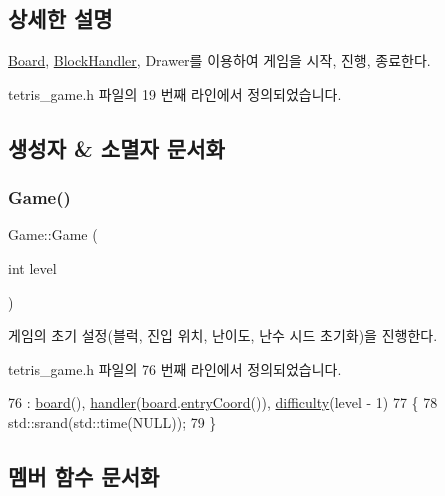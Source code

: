 \subsection{상세한 설명}
\mbox{\hyperlink{class_board}{Board}}, \mbox{\hyperlink{class_block_handler}{Block\+Handler}}, Drawer를 이용하여 게임을 시작, 진행, 종료한다. 

tetris\+\_\+game.\+h 파일의 19 번째 라인에서 정의되었습니다.



\subsection{생성자 \& 소멸자 문서화}
\mbox{\label{class_game_a46a5ded6c47eeab8c880ebf0d6abd0cf}} 
\subsubsection{\texorpdfstring{Game()}{Game()}}
{\footnotesize\ttfamily Game\+::\+Game (\begin{DoxyParamCaption}\item[{int}]{level }\end{DoxyParamCaption})\hspace{0.3cm}{\ttfamily [inline]}}



게임의 초기 설정(블럭, 진입 위치, 난이도, 난수 시드 초기화)을 진행한다. 



tetris\+\_\+game.\+h 파일의 76 번째 라인에서 정의되었습니다.


\begin{DoxyCode}
76                     : \mbox{\hyperlink{class_game_af5bc546b0c766ecf2f7e008f750832ed}{board}}(), \mbox{\hyperlink{class_game_ae72b7259125e83dfd258c6a132394eec}{handler}}(\mbox{\hyperlink{class_game_af5bc546b0c766ecf2f7e008f750832ed}{board}}.\mbox{\hyperlink{class_board_a902cd3b288be772ba6b7abc6a822afea}{entryCoord}}()), 
      \mbox{\hyperlink{class_game_a536a6390d16f05d402928bd731e06ef3}{difficulty}}(level - 1)
77     \{
78         std::srand(std::time(NULL));
79     \}
\end{DoxyCode}


\subsection{멤버 함수 문서화}
\mbox{\label{class_game_aa61075838d60bc5c850b72bc4804b7b8}} 
